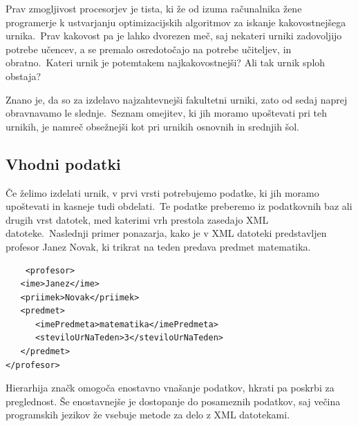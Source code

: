 \documentclass[a4paper,10pt]{article}
\begin{document}
Prav zmogljivost procesorjev je tista, ki že od izuma računalnika žene programerje k
ustvarjanju optimizacijskih algoritmov za iskanje kakovostnejšega urnika.\ Prav kakovost
pa je lahko dvorezen meč, saj nekateri urniki zadovoljijo potrebe učencev, a se premalo
osredotočajo na potrebe učiteljev, in obratno.\ Kateri urnik je potemtakem najkakovostnejši?
Ali tak urnik sploh obstaja?

Znano je, da so za izdelavo najzahtevnejši fakultetni urniki, zato od sedaj naprej
obravnavamo le slednje.\ Seznam omejitev, ki jih moramo upoštevati pri teh urnikih,
je namreč obsežnejši kot pri urnikih osnovnih in srednjih šol.

\subsection{Vhodni podatki} %

Če želimo izdelati urnik, v prvi vrsti potrebujemo podatke, ki jih moramo upoštevati in
kasneje tudi obdelati.\ Te podatke preberemo iz podatkovnih baz ali drugih vrst datotek,
med katerimi vrh prestola zasedajo XML datoteke.\ Naslednji primer ponazarja, kako je v
XML datoteki predstavljen profesor Janez Novak, ki trikrat na teden predava predmet
matematika.


\begin{verbatim}
	<profesor>
   <ime>Janez</ime>
   <priimek>Novak</priimek>
   <predmet>
      <imePredmeta>matematika</imePredmeta>
      <steviloUrNaTeden>3</steviloUrNaTeden>
   </predmet>
</profesor>
\end{verbatim}

\noindent Hierarhija značk omogoča enostavno vnašanje podatkov, hkrati pa poskrbi za preglednost.
Še enostavnejše je dostopanje do posameznih podatkov, saj večina programskih jezikov že
vsebuje metode za delo z XML datotekami.
\end{document}

